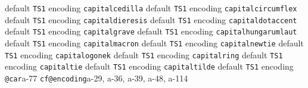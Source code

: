 \documentclass[twoside]{ltxdoc}
\makeatletter
\renewenvironment{theindex}{%
   \@restonecoltrue
   \if@twocolumn\@restonecolfalse\fi
   \columnseprule \z@
   \columnsep 35\p@
   \twocolumn[\index@prologue]%
   \IndexParms
   \let\item\@idxitem
   \ignorespaces
}{\if@restonecol\onecolumn\else\clearpage\fi}
\makeatother
\begin{document}
\begin{theindex}
    \subitem default\pfill {}
    \subitem \texttt  {TS1} encoding\pfill {}
  \item \texttt  {capitalcedilla}\efill 
    \subitem default\pfill {}
    \subitem \texttt  {TS1} encoding\pfill {}
  \item \texttt  {capitalcircumflex}\efill 
    \subitem default\pfill {}
    \subitem \texttt  {TS1} encoding\pfill {}
  \item \texttt  {capitaldieresis}\efill 
    \subitem default\pfill {}
    \subitem \texttt  {TS1} encoding\pfill {}
  \item \texttt  {capitaldotaccent}\efill 
    \subitem default\pfill {}
    \subitem \texttt  {TS1} encoding\pfill {}
  \item \texttt  {capitalgrave}\efill 
    \subitem default\pfill {}
    \subitem \texttt  {TS1} encoding\pfill {}
  \item \texttt  {capitalhungarumlaut}\efill 
    \subitem default\pfill {}
    \subitem \texttt  {TS1} encoding\pfill {}
  \item \texttt  {capitalmacron}\efill 
    \subitem default\pfill {}
    \subitem \texttt  {TS1} encoding\pfill {}
  \item \texttt  {capitalnewtie}\efill 
    \subitem default\pfill {}
    \subitem \texttt  {TS1} encoding\pfill {}
  \item \texttt  {capitalogonek}\efill 
    \subitem default\pfill {}
    \subitem \texttt  {TS1} encoding\pfill {}
  \item \texttt  {capitalring}\efill 
    \subitem default\pfill {}
    \subitem \texttt  {TS1} encoding\pfill {}
  \item \texttt  {capitaltie}\efill 
    \subitem default\pfill {}
    \subitem \texttt  {TS1} encoding\pfill {}
  \item \texttt  {capitaltilde}\efill 
    \subitem default\pfill {}
    \subitem \texttt  {TS1} encoding\pfill {}
  \item \texttt  {@car}\pfill a-77
  \item \texttt  {cf@encoding}\pfill a-29, a-36, a-39, 
                a-48, a-114

\end{theindex}
\end{document}
